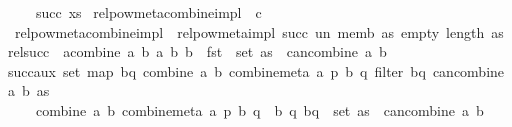 \begin{isabellebody}
\ \ \ \ {\isacharat}{\kern0pt}\ succ\ xs{\isachardoublequoteclose}\isanewline
\isanewline
{}\isamarkupfalse%
\ relpow{\isacharunderscore}{\kern0pt}meta{\isacharunderscore}{\kern0pt}combine{\isacharunderscore}{\kern0pt}impl\ {\isacharcolon}{\kern0pt}{\isacharcolon}{\kern0pt}\ {\isacharprime}{\kern0pt}c\ \isanewline
\ \ {\isachardoublequoteopen}relpow{\isacharunderscore}{\kern0pt}meta{\isacharunderscore}{\kern0pt}combine{\isacharunderscore}{\kern0pt}impl\ {\isacharequal}{\kern0pt}\ relpow{\isacharunderscore}{\kern0pt}meta{\isacharunderscore}{\kern0pt}impl\ succ\ un\ memb\ as\ empty\ {\isacharparenleft}{\kern0pt}length\ as{\isacharparenright}{\kern0pt}{\isachardoublequoteclose}\isanewline
\isanewline
{}\isamarkupfalse%
\ {\isachardoublequoteopen}rel{\isacharunderscore}{\kern0pt}succ\ {\isasymequiv}\ {\isacharbraceleft}{\kern0pt}{\isacharparenleft}{\kern0pt}a{\isacharcomma}{\kern0pt}combine\ a\ b{\isacharparenright}{\kern0pt}\ {\isacharbar}{\kern0pt}a\ b{\isachardot}{\kern0pt}\ b\ {\isasymin}\ fst\ {\isacharbackquote}{\kern0pt}\ set\ as\ {\isasymand}\ can{\isacharunderscore}{\kern0pt}combine\ a\ b{\isacharbraceright}{\kern0pt}{\isachardoublequoteclose}\isanewline
\isanewline
{}\isamarkupfalse%
\ succ{\isacharunderscore}{\kern0pt}aux{\isacharcolon}{\kern0pt}\ {\isachardoublequoteopen}set\ {\isacharparenleft}{\kern0pt}map\ {\isacharparenleft}{\kern0pt}{\isasymlambda}{\isacharparenleft}{\kern0pt}b{\isacharcomma}{\kern0pt}q{\isacharparenright}{\kern0pt}{\isachardot}{\kern0pt}\ {\isacharparenleft}{\kern0pt}combine\ a\ b{\isacharcomma}{\kern0pt}\ combine{\isacharunderscore}{\kern0pt}meta\ a\ p\ b\ q{\isacharparenright}{\kern0pt}{\isacharparenright}{\kern0pt}\ {\isacharparenleft}{\kern0pt}filter\ {\isacharparenleft}{\kern0pt}{\isasymlambda}{\isacharparenleft}{\kern0pt}b{\isacharcomma}{\kern0pt}q{\isacharparenright}{\kern0pt}{\isachardot}{\kern0pt}\ can{\isacharunderscore}{\kern0pt}combine\ a\ b{\isacharparenright}{\kern0pt}\ as{\isacharparenright}{\kern0pt}{\isacharparenright}{\kern0pt}\isanewline
\ \ \ \ {\isacharequal}{\kern0pt}\ {\isacharbraceleft}{\kern0pt}{\isacharparenleft}{\kern0pt}combine\ a\ b{\isacharcomma}{\kern0pt}\ combine{\isacharunderscore}{\kern0pt}meta\ a\ p\ b\ q{\isacharparenright}{\kern0pt}\ {\isacharbar}{\kern0pt}\ b\ q{\isachardot}{\kern0pt}\ {\isacharparenleft}{\kern0pt}b{\isacharcomma}{\kern0pt}q{\isacharparenright}{\kern0pt}\ {\isasymin}\ set\ as\ {\isasymand}\ can{\isacharunderscore}{\kern0pt}combine\ a\ b{\isacharbraceright}{\kern0pt}{\isachardoublequoteclose}%
\isadelimproof

\end{isabellebody}
